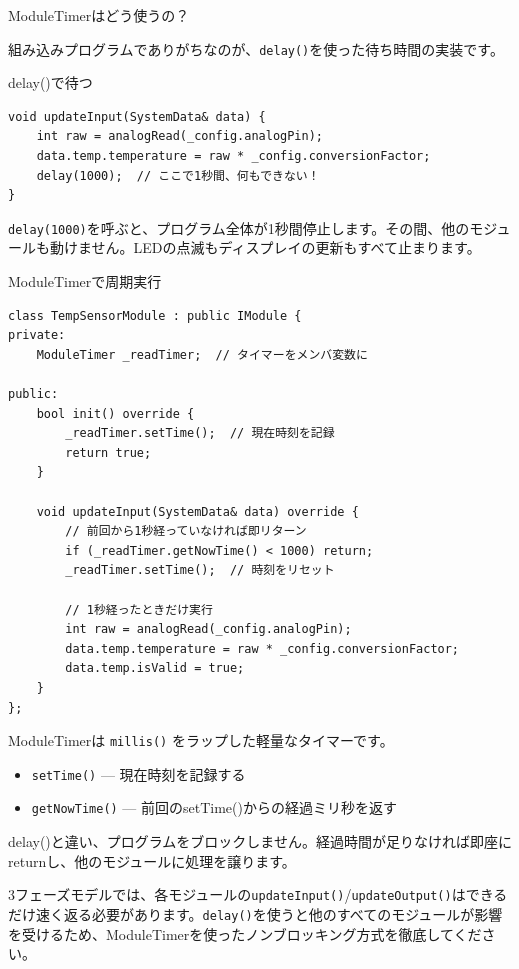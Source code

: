 \begin{qabox}{ModuleTimerはどう使うの？}

組み込みプログラムでありがちなのが、\texttt{delay()}を使った待ち時間の実装です。

\begin{badexample}{delay()で待つ}
\begin{lstlisting}
void updateInput(SystemData& data) {
    int raw = analogRead(_config.analogPin);
    data.temp.temperature = raw * _config.conversionFactor;
    delay(1000);  // ここで1秒間、何もできない！
}
\end{lstlisting}
\end{badexample}

\texttt{delay(1000)}を呼ぶと、プログラム全体が1秒間停止します。その間、他のモジュールも動けません。LEDの点滅もディスプレイの更新もすべて止まります。

\begin{goodexample}{ModuleTimerで周期実行}
\begin{lstlisting}
class TempSensorModule : public IModule {
private:
    ModuleTimer _readTimer;  // タイマーをメンバ変数に

public:
    bool init() override {
        _readTimer.setTime();  // 現在時刻を記録
        return true;
    }

    void updateInput(SystemData& data) override {
        // 前回から1秒経っていなければ即リターン
        if (_readTimer.getNowTime() < 1000) return;
        _readTimer.setTime();  // 時刻をリセット

        // 1秒経ったときだけ実行
        int raw = analogRead(_config.analogPin);
        data.temp.temperature = raw * _config.conversionFactor;
        data.temp.isValid = true;
    }
};
\end{lstlisting}
\end{goodexample}

ModuleTimerは \texttt{millis()} をラップした軽量なタイマーです。

\begin{itemize}
  \item \texttt{setTime()} — 現在時刻を記録する
  \item \texttt{getNowTime()} — 前回のsetTime()からの経過ミリ秒を返す
\end{itemize}

delay()と違い、プログラムをブロックしません。経過時間が足りなければ即座にreturnし、他のモジュールに処理を譲ります。

\begin{cautionbox}
3フェーズモデルでは、各モジュールの\texttt{updateInput()}/\texttt{updateOutput()}はできるだけ速く返る必要があります。\texttt{delay()}を使うと他のすべてのモジュールが影響を受けるため、ModuleTimerを使ったノンブロッキング方式を徹底してください。
\end{cautionbox}

\end{qabox}
